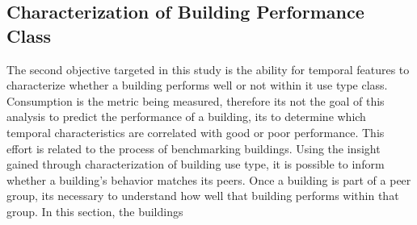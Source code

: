\subsection{Characterization of Building Performance Class}
\label{sec:results_benchmarking}

The second objective targeted in this study is the ability for temporal features to characterize whether a building performs well or not within it use type class. Consumption is the metric being measured, therefore its not the goal of this analysis to predict the performance of a building, its to determine which temporal characteristics are correlated with good or poor performance. This effort is related to the process of benchmarking buildings. Using the insight gained through characterization of building use type, it is possible to inform whether a building's behavior matches its peers. Once a building is part of a peer group, its necessary to understand how well that building performs within that group. In this section, the buildings 




